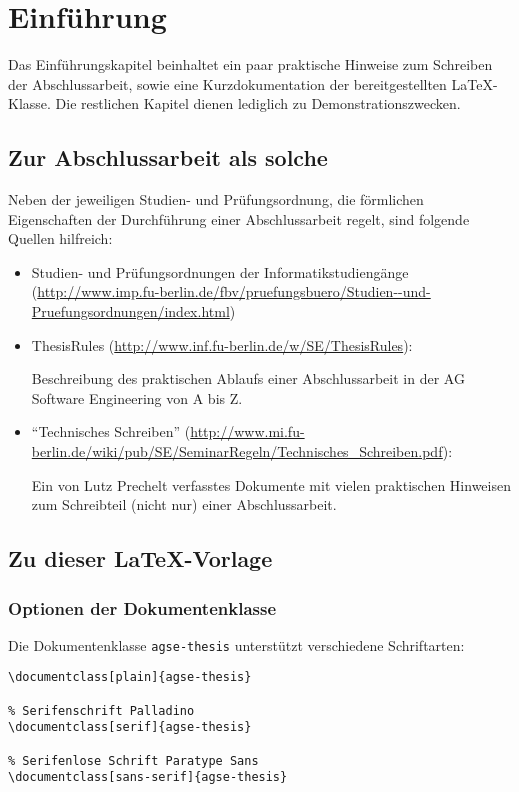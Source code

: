 \section{Einführung}

Das Einführungskapitel beinhaltet ein paar praktische Hinweise zum Schreiben
der Abschlussarbeit, sowie eine Kurzdokumentation der bereitgestellten
\LaTeX-Klasse.
Die restlichen Kapitel dienen lediglich zu Demonstrationszwecken.

\subsection{Zur Abschlussarbeit als solche}

Neben der jeweiligen Studien- und Prüfungsordnung, die förmlichen Eigenschaften
der Durchführung einer Abschlussarbeit regelt, sind folgende Quellen hilfreich:
\begin{itemize}
    \item Studien- und Prüfungsordnungen der Informatikstudiengänge
    (\url{http://www.imp.fu-berlin.de/fbv/pruefungsbuero/Studien--und-Pruefungsordnungen/index.html})

    \item ThesisRules (\url{http://www.inf.fu-berlin.de/w/SE/ThesisRules}):

    Beschreibung des praktischen Ablaufs einer Abschlussarbeit in der AG
    Software Engineering von A bis Z.

    \item "`Technisches Schreiben"'
    (\url{http://www.mi.fu-berlin.de/wiki/pub/SE/SeminarRegeln/Technisches_Schreiben.pdf}):

    Ein von Lutz Prechelt verfasstes Dokumente mit vielen praktischen
    Hinweisen zum Schreibteil (nicht nur) einer Abschlussarbeit.
\end{itemize}

\subsection{Zu dieser \LaTeX{}-Vorlage}

\subsubsection{Optionen der Dokumentenklasse}

Die Dokumentenklasse \texttt{agse-thesis} unterstützt verschiedene
Schriftarten:
\begin{lstlisting}[language={[LaTeX]TeX}]
% Standard LaTeX Schriftart
\documentclass[plain]{agse-thesis}

% Serifenschrift Palladino
\documentclass[serif]{agse-thesis}

% Serifenlose Schrift Paratype Sans
\documentclass[sans-serif]{agse-thesis}
\end{lstlisting}

